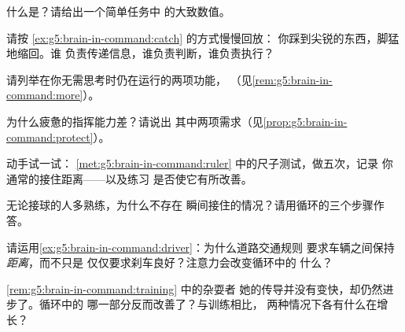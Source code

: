 \begin{exercise}[$\star$]\label{exo:g5:brain-in-command:4}
什么是？请给出一个简单任务中
的大致数值。
\end{exercise}

\begin{exercise}[$\star$]\label{exo:g5:brain-in-command:5}
请按 \cref{ex:g5:brain-in-command:catch} 的方式慢慢回放：
你踩到尖锐的东西，脚猛地缩回。谁
负责传递信息，谁负责判断，谁负责执行？
\end{exercise}

\begin{exercise}[$\star$]\label{exo:g5:brain-in-command:6}
请列举在你无需思考时仍在运行的两项功能，
（见\cref{rem:g5:brain-in-command:more}）。
\end{exercise}

\begin{exercise}[$\star$]\label{exo:g5:brain-in-command:7}
为什么疲惫的指挥能力差？请说出
其中两项需求（见\cref{prop:g5:brain-in-command:protect}）。
\end{exercise}

\begin{exercise}[$\star$]\label{exo:g5:brain-in-command:8}
动手试一试：
\cref{met:g5:brain-in-command:ruler} 中的尺子测试，做五次，记录
你通常的接住距离——以及练习
是否使它有所改善。
\end{exercise}

\begin{exercise}[$\star\star$]\label{exo:g5:brain-in-command:9}
无论接球的人多熟练，为什么不存在
瞬间接住的情况？请用循环的三个步骤作答。
\end{exercise}

\begin{exercise}[$\star\star$]\label{exo:g5:brain-in-command:10}
请运用\cref{ex:g5:brain-in-command:driver}：为什么道路交通规则
要求车辆之间保持\emph{距离}，而不只是
仅仅要求刹车良好？注意力会改变循环中的
什么？
\end{exercise}

\begin{exercise}[$\star\star\star$]\label{exo:g5:brain-in-command:11}
\cref{rem:g5:brain-in-command:training} 中的杂耍者
她的传导并没有变快，却仍然进步了。循环中的
哪一部分反而改善了？与训练相比，
两种情况下各有什么在增长？
\end{exercise}
